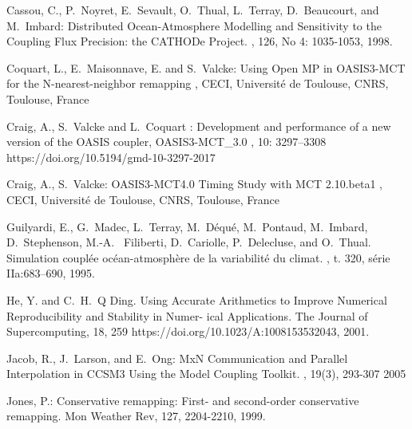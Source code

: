 \newpage
\begin{thebibliography}{10}
\vspace{-0.3cm}
Cassou, C., P.~Noyret, E.~Sevault, O.~Thual, L.~Terray, D.~Beaucourt, and
  M.~Imbard:
\newblock Distributed Ocean-Atmosphere Modelling and Sensitivity to the
  Coupling Flux Precision: the CATHODe Project.
, 126, No 4: 1035-1053, 1998.

Coquart, L., E.~Maisonnave, E. and S.~Valcke:
\newblock Using Open MP in OASIS3-MCT for the N-nearest-neighbor remapping
,  
\newblock CECI, Universit\'e de Toulouse, CNRS, Toulouse, France

Craig, A., S.~Valcke and L.~Coquart : 
\newblock Development and performance of a new version of the OASIS coupler, OASIS3-MCT\_3.0
, 10: 3297--3308
\newblock https://doi.org/10.5194/gmd-10-3297-2017

Craig, A., S.~Valcke: 
\newblock OASIS3-MCT4.0 Timing Study with MCT 2.10.beta1
,  
\newblock CECI, Universit\'e de Toulouse, CNRS, Toulouse, France

Guilyardi, E., G.~Madec, L.~Terray, M.~D\'equ\'e, M.~Pontaud, M.~Imbard, D.~Stephenson, M.-A. ~Filiberti, D.~Cariolle, P.~Delecluse, and O.~Thual. 
\newblock Simulation coupl\'ee oc\'ean-atmosph\`ere de la variabilit\'e du climat.
, t. 320, s\'erie IIa:683--690, 1995. 

He, Y. and C.~H.~Q Ding.
\newblock Using Accurate Arithmetics to Improve Numerical Reproducibility and Stability in Numer- ical Applications.
\newblock The Journal of Supercomputing, 18, 259
\newblock https://doi.org/10.1023/A:1008153532043, 2001.

Jacob, R., J.~Larson, and E.~Ong:
\newblock MxN Communication and Parallel Interpolation in CCSM3 Using the Model Coupling Toolkit.
, 19(3), 293-307 2005

Jones, P.: 
\newblock Conservative remapping: First- and second-order conservative remapping.
\newblock Mon Weather Rev, 127, 2204-2210, 1999. 


\end{thebibliography}
